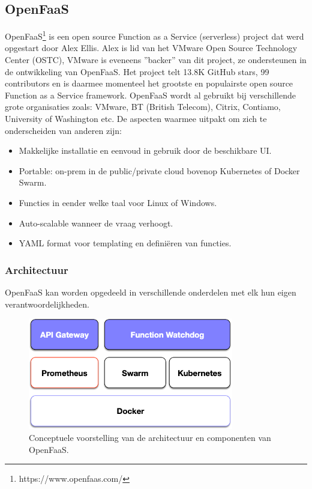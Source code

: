 \subsection{OpenFaaS}
OpenFaaS\footnote{https://www.openfaas.com/} is een open source Function as a Service (serverless) project dat werd opgestart door Alex Ellis. Alex is lid van het VMware Open Source Technology Center (OSTC), VMware is eveneens ''backer'' van dit project, ze ondersteunen in de ontwikkeling van OpenFaaS. Het project telt 13.8K GitHub stars, 99 contributors en is daarmee momenteel het grootste en populairste open source Function as a Service framework. OpenFaaS wordt al gebruikt bij verschillende grote organisaties zoals: VMware, BT (British Telecom), Citrix, Contiamo, University of Washington etc.
De aspecten waarmee \textcite{OpenFaaS2019} uitpakt om zich te onderscheiden van anderen zijn:
\begin{itemize}
    \item Makkelijke installatie en eenvoud in gebruik door de beschikbare UI.
    \item Portable: on-prem in de public/private cloud  bovenop Kubernetes of Docker Swarm.
    \item Functies in eender welke taal voor Linux of Windows.
    \item Auto-scalable wanneer de vraag verhoogt.
    \item YAML format voor templating en definiëren van functies.
\end{itemize}

\subsubsection{Architectuur}
OpenFaaS kan worden opgedeeld in verschillende onderdelen met elk hun eigen verantwoordelijkheden.
\begin{figure}
    \centering
    \includegraphics[width=0.8\textwidth]{img/openfaas-architectuur.png}
    \caption{Conceptuele voorstelling van de architectuur en componenten van OpenFaaS.}
    \label{fig:open-faas-conceptueel}  
\end{figure}


